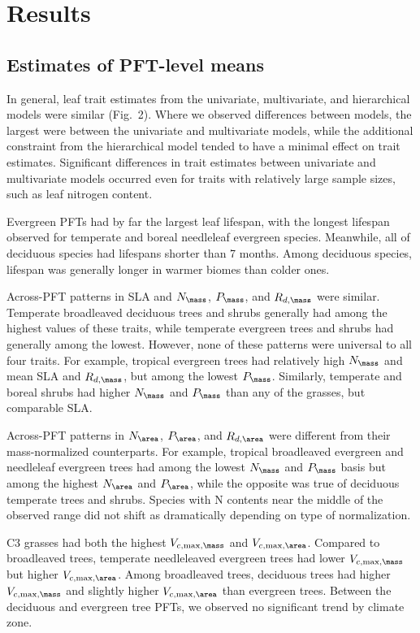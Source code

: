 \section{Results}\label{sec:mvtraits-results}

\subsection{Estimates of PFT-level means}

In general, leaf trait estimates from the univariate, multivariate, and hierarchical models were similar (Fig.\ 2).
Where we observed differences between models, the largest were between the univariate and multivariate models, while the additional constraint from the hierarchical model tended to have a minimal effect on trait estimates.
Significant differences in trait estimates between univariate and multivariate models occurred even for traits with relatively large sample sizes, such as leaf nitrogen content.

Evergreen PFTs had by far the largest leaf lifespan, with the longest lifespan observed for temperate and boreal needleleaf evergreen species.
Meanwhile, all of deciduous species had lifespans shorter than 7 months.
Among deciduous species, lifespan was generally longer in warmer biomes than colder ones.

Across-PFT patterns in SLA and $N_{\mass}$, $P_{\mass}$, and $R_{d,\mass}$ were similar.
Temperate broadleaved deciduous trees and shrubs generally had among the highest values of these traits, while temperate evergreen trees and shrubs had generally among the lowest.
However, none of these patterns were universal to all four traits.
For example, tropical evergreen trees had relatively high $N_{\mass}$ and mean SLA and $R_{d,\mass}$, but among the lowest $P_{\mass}$.
Similarly, temperate and boreal shrubs had higher $N_{\mass}$ and $P_{\mass}$ than any of the grasses, but comparable SLA\@.

Across-PFT patterns in $N_{\area}$, $P_{\area}$, and $R_{d,\area}$ were different from their mass-normalized counterparts.
For example, tropical broadleaved evergreen and needleleaf evergreen trees had among the lowest $N_{\mass}$ and $P_{\mass}$ basis but among the highest $N_{\area}$ and $P_{\area}$, while the opposite was true of deciduous temperate trees and shrubs.
Species with N contents near the middle of the observed range did not shift as dramatically depending on type of normalization.

C3 grasses had both the highest $V_{c,\max,\mass}$ and $V_{c,\max,\area}$.
Compared to broadleaved trees, temperate needleleaved evergreen trees had lower $V_{c,\max,\mass}$ but higher $V_{c,\max,\area}$.
Among broadleaved trees, deciduous trees had higher $V_{c,\max,\mass}$ and slightly higher $V_{c,\max,\area}$ than evergreen trees.
Between the deciduous and evergreen tree PFTs, we observed no significant trend by climate zone.

